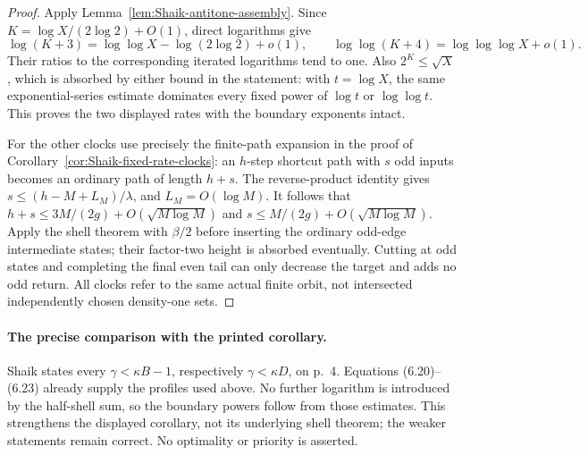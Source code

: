 \begin{proof}
Apply Lemma~\ref{lem:Shaik-antitone-assembly}. Since
\(K=\log X/(2\log2)+O(1)\), direct logarithms give
\[
 \log(K+3)=\log\log X-\log(2\log2)+o(1),\qquad
 \log\log(K+4)=\log\log\log X+o(1).
\]
Their ratios to the corresponding iterated logarithms tend to one.
Also \(2^K\le\sqrt X\), which is absorbed by either bound in the
statement: with \(t=\log X\), the same exponential-series estimate
dominates every fixed power of \(\log t\) or \(\log\log t\).
This proves the two displayed rates with the boundary exponents intact.

For the other clocks use precisely the finite-path expansion in the
proof of Corollary~\ref{cor:Shaik-fixed-rate-clocks}: an \(h\)-step shortcut
path with \(s\) odd inputs becomes an ordinary path of length \(h+s\).
The reverse-product identity gives
\(s\le(h-M+L_M)/\lambda\), and \(L_M=O(\log M)\).
It follows that \(h+s\le3M/(2g)+O(\sqrt{M\log M})\) and
\(s\le M/(2g)+O(\sqrt{M\log M})\).
Apply the shell theorem with \(\beta/2\) before inserting the ordinary
odd-edge intermediate states; their factor-two height is absorbed
eventually. Cutting at odd states and completing the final even tail
can only decrease the target and adds no odd return.
All clocks refer to the same actual finite orbit, not intersected
independently chosen density-one sets.
\end{proof}

\paragraph{The precise comparison with the printed corollary.}
Shaik states every \(\gamma<\kappa B-1\), respectively
\(\gamma<\kappa D\), on p.~4. Equations (6.20)--(6.23) already supply
the profiles used above. No further logarithm is introduced by the
half-shell sum, so the boundary powers follow from those estimates.
This strengthens the displayed corollary, not its underlying shell
theorem; the weaker statements remain correct. No optimality or
priority is asserted.

